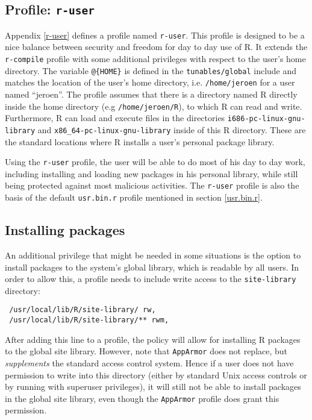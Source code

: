 \documentclass[article]{jss}
\newcommand{\R}{\textsf{R}\xspace}
\newcommand{\AppArmor}{\texttt{AppArmor}\xspace}
\begin{document}
\subsection[Profile: r-user]{Profile: \texttt{r-user}}

Appendix \ref{r-user} defines a profile named \texttt{r-user}. This profile is
designed to be a nice balance between security and freedom for day to day use of
R. It extends the \texttt{r-compile} profile with some additional privileges
with respect to the user's home directory. The variable \texttt{@\{HOME\}} is
defined in the \texttt{tunables/global} include and matches the location of the
user's home directory, i.e. \texttt{/home/jeroen} for a user named ``jeroen''.
The profile assumes that there is a directory named \R directly inside
the home directory (e.g \texttt{/home/jeroen/R}), to which \R can read and
write. Furthermore, \R can load and execute files in the directories
\texttt{i686-pc-linux-gnu-library} and \texttt{x86\_64-pc-linux-gnu-library}
inside of this \R directory. These are the standard locations where
\R installs a user's personal package library.

Using the \texttt{r-user} profile, the user will be able to do most of his day
to day work, including installing and loading new packages in his personal
library, while still being protected against most malicious activities. The
\texttt{r-user} profile is also the basis of the default \texttt{usr.bin.r}
profile mentioned in section \ref{usr.bin.r}.

\subsection{Installing packages}

An additional privilege that might be needed in some situations is the option to
install packages to the system's global library, which is readable by all
users. In order to allow this, a profile needs to include write access to the
\texttt{site-library} directory:

\begin{verbatim}
 /usr/local/lib/R/site-library/ rw,
 /usr/local/lib/R/site-library/** rwm,
\end{verbatim}

After adding this line to a profile, the policy will allow for installing R
packages to the global site library. However, note that \AppArmor does not
replace, but \emph{supplements} the standard access control system. Hence if a
user does not have permission to write into this directory (either by
standard Unix access controls or by running with superuser privileges), it will
still not be able to install packages in the global site library, even though
the \AppArmor profile does grant this permission.
\end{document}
